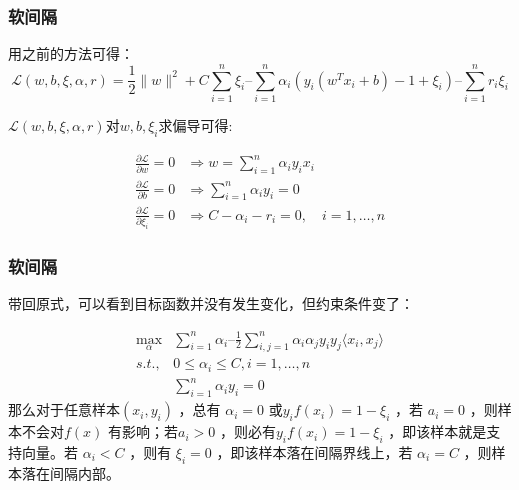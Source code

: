 \begin{frame}
\frametitle{软间隔}

用之前的方法可得：
\[
\mathcal{L}(w,b,\xi,\alpha,r)=\frac{1}{2}\|w\|^2 + C\sum_{i=1}^n\xi_i – \sum_{i=1}^n\alpha_i \left(y_i(w^Tx_i+b)-1+\xi_i\right) – \sum_{i=1}^n r_i\xi_i
\]

$\mathcal{L}(w,b,\xi,\alpha,r)$对$w,b,\xi_i$求偏导可得:

\begin{align*}
\frac{\partial \mathcal{L}}{\partial w}=0 &\Rightarrow w=\sum_{i=1}^n \alpha_i y_i x_i \\
\frac{\partial \mathcal{L}}{\partial b} = 0 &\Rightarrow \sum_{i=1}^n \alpha_i y_i = 0 \\
\frac{\partial \mathcal{L}}{\partial \xi_i} = 0 &\Rightarrow C-\alpha_i-r_i=0, \quad i=1,\ldots,n 
\end{align*}

\end{frame}


\begin{frame}
\frametitle{软间隔}

带回原式，可以看到目标函数并没有发生变化，但约束条件变了：

\begin{align*}
\max_\alpha &\sum_{i=1}^n\alpha_i – \frac{1}{2}\sum_{i,j=1}^n\alpha_i\alpha_jy_iy_j\langle x_i,x_j\rangle \\
s.t., &0\leq \alpha_i\leq C, i=1,\ldots,n \\
&\sum_{i=1}^n\alpha_iy_i = 0
\end{align*}
那么对于任意样本$(x_i,y_i)$ ，总有 $\alpha_i=0$ 或$ y_if(x_i) = 1-\xi_i$  ，若 $a_i=0$ ，则样本不会对$ f(x)$ 有影响；若$ a_i>0$ ，则必有$ y_if(x_i) = 1-\xi_i$ ，即该样本就是支持向量。若 $\alpha_i<C$ ，则有 $\xi_i=0$ ，即该样本落在间隔界线上，若 $\alpha_i=C$ ，则样本落在间隔内部。
\end{frame}